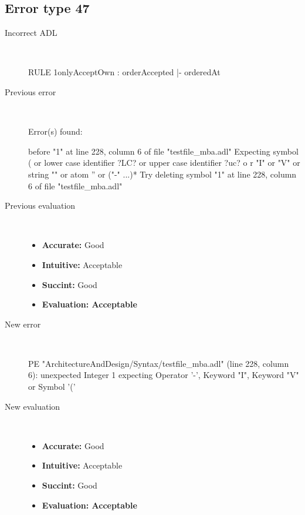 \subsection{Error type 47}
  \begin{description}
  \item[Incorrect ADL]~\\
\begin{adl}
RULE 1onlyAcceptOwn : orderAccepted |- orderedAt\end{adl}
  \item[Previous error]~\\
\begin{haskell}
Error(s) found:

before "1" at line 228, column 6 of file "testfile_mba.adl"
Expecting symbol ( or lower case identifier ?LC? or upper case identifier ?uc? o
r "I" or "V" or string "" or atom '' or ("-" ...)*
Try deleting symbol "1" at line 228, column 6 of file "testfile_mba.adl"
\end{haskell}
  \item[Previous evaluation]~\\
    \begin{itemize}
    \item \textbf{Accurate:} Good
    \item \textbf{Intuitive:} Acceptable
    \item \textbf{Succint:} Good
    \item \textbf{Evaluation: Acceptable}
    \end{itemize}
  \item[New error]~\\
\begin{haskell}
PE "ArchitectureAndDesign/Syntax/testfile_mba.adl" (line 228, column 6):
unexpected Integer 1
expecting Operator '-', Keyword "I", Keyword "V" or Symbol '('\end{haskell}
  \item[New evaluation]~\\
    \begin{itemize}
    \item \textbf{Accurate:} Good
    \item \textbf{Intuitive:} Acceptable
    \item \textbf{Succint:} Good
    \item \textbf{Evaluation: Acceptable
}
    \end{itemize}
  \end{description}

\hrulefill

